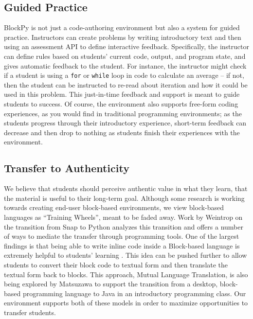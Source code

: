 \documentclass{sig-alternate}
\begin{document}
\subsection{Guided Practice}

BlockPy is not just a code-authoring environment but also a system for guided practice.
Instructors can create problems by writing introductory text and then using an assessment API to define interactive feedback.
Specifically, the instructor can define rules based on students' current code, output, and program state, and gives automatic feedback to the student.
For instance, the instructor might check if a student is using a \texttt{for} or \texttt{while} loop in code to calculate an average -- if not, then the student can be instructed to re-read about iteration and how it could be used in this problem.
This just-in-time feedback and support is meant to guide students to success.
Of course, the environment also supports free-form coding experiences, as you would find in traditional programming environments; as the students progress through their introductory experience, short-term feedback can decrease and then drop to nothing as students finish their experiences with the environment.

\subsection{Transfer to Authenticity}


We believe that students should perceive authentic value in what they learn, that the material is useful to their long-term goal.
Although some research is working towards creating end-user block-based environments, we view block-based languages as ``Training Wheels'', meant to be faded away.
Work by Weintrop on the transition from Snap to Python analyzes this transition and offers a number of ways to mediate the transfer through programming tools. 
One of the largest findings is that being able to write inline code inside a Block-based language is extremely helpful to students' learning \cite{Weintrop}.
This idea can be pushed further to allow students to convert their block code to textual form and then translate the textual form back to blocks.
This approach, Mutual Language Translation, is also being explored by Matsuzawa\cite{Matsuzawa} to support the transition from a desktop, block-based programming language to Java in an introductory programming class. 
Our environment supports both of these models in order to maximize opportunities to transfer students.
	
\end{document}
